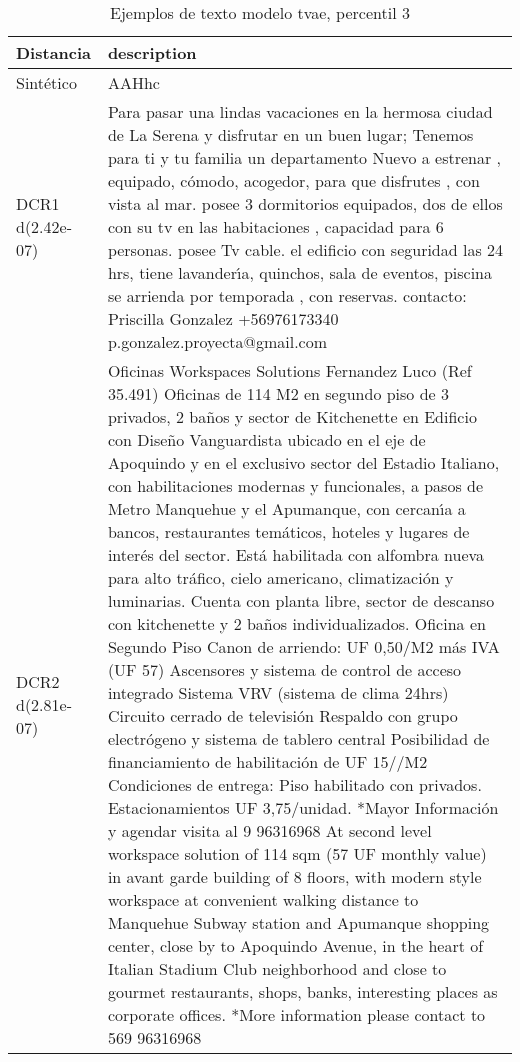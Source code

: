 \begin{table}[H]
\centering
\fontsize{10}{14}\selectfont
\caption{Ejemplos de texto modelo tvae, percentil 3}
\label{table-example-economicos-a-2-tvae-3p-text}
\begin{tabular}{|l|m{35em}|}
\hline
\rowcolor[gray]{0.8}
Distancia & description \\
\hline Sintético & AAHhc \\
\hline DCR1 d(2.42e-07) & Para pasar una lindas vacaciones en la hermosa ciudad de La Serena y disfrutar en un buen lugar; Tenemos para ti y tu familia un departamento Nuevo a estrenar , equipado, c\'omodo, acogedor, para que disfrutes , con vista al mar. posee 3 dormitorios equipados, dos de ellos con su tv en las habitaciones , capacidad para 6 personas.
 posee Tv cable. el edificio con seguridad las 24 hrs, tiene lavander{\'\i}a, quinchos, sala de eventos, piscina se arrienda por temporada , con reservas. contacto: Priscilla Gonzalez  +56976173340 p.gonzalez.proyecta@gmail.com \\
\hline DCR2 d(2.81e-07) & Oficinas Workspaces Solutions Fernandez Luco (Ref 35.491) Oficinas de 114 M2 en segundo piso de 3 privados, 2 ba\~nos y sector de Kitchenette en Edificio con Dise\~no Vanguardista ubicado en el eje de Apoquindo y en el exclusivo sector del Estadio Italiano, con habilitaciones modernas y funcionales, a pasos de Metro Manquehue y el Apumanque, con cercan{\'\i}a a bancos, restaurantes tem\'aticos, hoteles y lugares de inter\'es del sector. Est\'a habilitada con alfombra nueva para alto tr\'afico, cielo americano, climatizaci\'on y luminarias. Cuenta con planta libre, sector de descanso con kitchenette y 2 ba\~nos individualizados. Oficina en Segundo Piso   Canon de arriendo: UF 0,50/M2 m\'as IVA (UF 57)   Ascensores y sistema de control de acceso integrado   Sistema VRV (sistema de clima 24hrs)   Circuito cerrado de televisi\'on   Respaldo con grupo electr\'ogeno y sistema de tablero central    Posibilidad de financiamiento de habilitaci\'on de UF 15//M2    Condiciones de entrega: Piso habilitado con privados.   Estacionamientos UF 3,75/unidad.  *Mayor Informaci\'on y agendar visita al 9 96316968 At second level workspace solution of 114 sqm (57 UF monthly value) in avant garde building of 8 floors, with modern style workspace at convenient walking distance to Manquehue Subway station and Apumanque shopping center, close by to Apoquindo Avenue, in the heart of Italian Stadium Club neighborhood and close to gourmet restaurants, shops, banks, interesting places as corporate offices. *More information please contact to 569 96316968 \\
\hline
\end{tabular}
\end{table}
